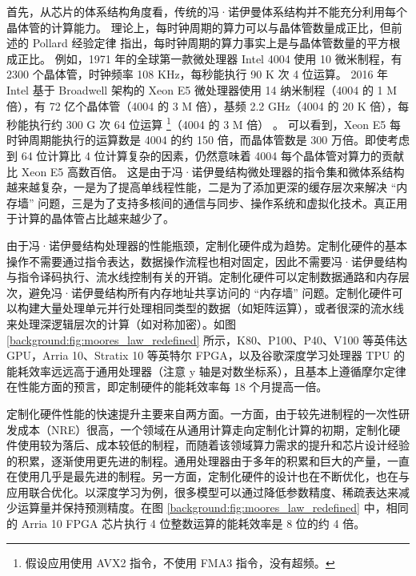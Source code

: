 首先，从芯片的体系结构角度看，传统的冯·诺伊曼体系结构并不能充分利用每个晶体管的计算能力。
理论上，每时钟周期的算力可以与晶体管数量成正比，但前述的 Pollard 经验定律 \cite{pollackpollack} 指出，每时钟周期的算力事实上是与晶体管数量的平方根成正比。
例如，1971 年的全球第一款微处理器 Intel 4004 使用 10 微米制程，有 2300 个晶体管，时钟频率 108 KHz，每秒能执行 90 K 次 4 位运算。
2016 年 Intel 基于 Broadwell 架构的 Xeon E5 微处理器使用 14 纳米制程（4004 的 1 M 倍），有 72 亿个晶体管（4004 的 3 M 倍），基频 2.2 GHz（4004 的 20 K 倍），每秒能执行约 300 G 次 64 位运算 \footnote{假设应用使用 AVX2 指令，不使用 FMA3 指令，没有超频。}（4004 的 3 M 倍） \cite{intel-e5-v4}。
可以看到，Xeon E5 每时钟周期能执行的运算数是 4004 的约 150 倍，而晶体管数是 300 万倍。即使考虑到 64 位计算比 4 位计算复杂的因素，仍然意味着 4004 每个晶体管对算力的贡献比 Xeon E5 高数百倍。
这是由于冯·诺伊曼结构微处理器的指令集和微体系结构越来越复杂，一是为了提高单线程性能，二是为了添加更深的缓存层次来解决 ``内存墙'' 问题，三是为了支持多核间的通信与同步、操作系统和虚拟化技术。真正用于计算的晶体管占比越来越少了。

由于冯·诺伊曼结构处理器的性能瓶颈，定制化硬件成为趋势。定制化硬件的基本操作不需要通过指令表达，数据操作流程也相对固定，因此不需要冯·诺伊曼结构与指令译码执行、流水线控制有关的开销。定制化硬件可以定制数据通路和内存层次，避免冯·诺伊曼结构所有内存地址共享访问的 ``内存墙'' 问题。定制化硬件可以构建大量处理单元并行处理相同类型的数据（如矩阵运算），或者很深的流水线来处理深逻辑层次的计算（如对称加密）。如图 \ref{background:fig:moores_law_redefined} 所示，K80、P100、P40、V100 等英伟达 GPU，Arria 10、Stratix 10 等英特尔 FPGA，以及谷歌深度学习处理器 TPU 的能耗效率远远高于通用处理器（注意 y 轴是对数坐标系），且基本上遵循摩尔定律在性能方面的预言，即定制硬件的能耗效率每 18 个月提高一倍。

定制化硬件性能的快速提升主要来自两方面。一方面，由于较先进制程的一次性研发成本（NRE）很高，一个领域在从通用计算走向定制化计算的初期，定制化硬件使用较为落后、成本较低的制程，而随着该领域算力需求的提升和芯片设计经验的积累，逐渐使用更先进的制程。通用处理器由于多年的积累和巨大的产量，一直在使用几乎是最先进的制程。另一方面，定制化硬件的设计也在不断优化，也在与应用联合优化。以深度学习为例，很多模型可以通过降低参数精度、稀疏表达来减少运算量并保持预测精度。在图 \ref{background:fig:moores_law_redefined} 中，相同的 Arria 10 FPGA 芯片执行 4 位整数运算的能耗效率是 8 位的约 4 倍。

